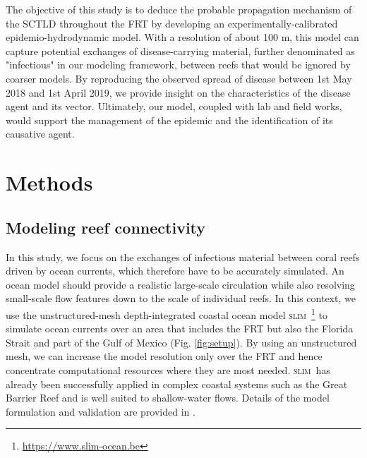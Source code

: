 \documentclass[utf8]{frontiersSCNS}
\newcommand{\slim}{\textsc{slim}\ }
\newcommand{\dan}[1]{\textbf{\textcolor{orange}{#1}}}
\begin{document}
The objective of this study is to deduce the probable propagation mechanism of the SCTLD throughout the FRT by developing an experimentally-calibrated epidemio-hydrodynamic model. With a resolution of about 100 m, this model can capture potential exchanges of disease-carrying material, further denominated as "infectious" in our modeling framework, between reefs that would be ignored by coarser models. By reproducing the observed spread of disease between 1st May 2018 and 1st April 2019, we provide insight on the characteristics of the disease agent and its vector. Ultimately, our model, coupled with lab and field works, would support the management of the epidemic and the identification of its causative agent.

\section{Methods}

\subsection{Modeling reef connectivity}
In this study, we focus on the exchanges of infectious material between coral reefs driven by ocean currents, which therefore have to be accurately simulated. An ocean model should provide a realistic large-scale circulation while also resolving small-scale flow features down to the scale of individual reefs. In this context, we use the unstructured-mesh depth-integrated coastal ocean model \slim\footnote{\url{https://www.slim-ocean.be}} to simulate ocean currents over an area that includes the FRT but also the Florida Strait and part of the Gulf of Mexico (Fig. \ref{fig:setup}). By using an unstructured mesh, we can increase the model resolution only over the FRT and hence concentrate computational resources where they are most needed. \slim has already been successfully applied in complex coastal systems such as the Great Barrier Reef \citep{lambrechts2008multi, thomas2014numerical} and is well suited to shallow-water flows. Details of the model formulation and validation are provided in \cite{frys20}. 
\end{document}
